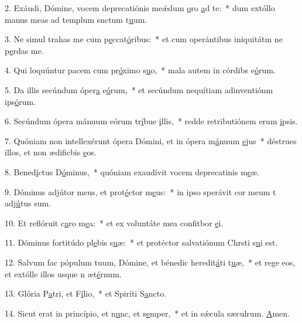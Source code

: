 2. Exáudi, Dómine, vocem deprecatiónis meǽdum \uline{o}ro \uline{a}d te:~* dum extóllo manus meas ad templum snctum t\uline{u}um.\par 
3. Ne simul trahas me cum p\uline{e}ccat\uline{ó}ribus:~* et cum operántibus iniquitátm ne p\uline{e}rdas me.\par 
4. Qui loquúntur pacem cum pr\uline{ó}ximo s\uline{u}o,~* mala autem in córdibs e\uline{ó}rum.\par 
5. Da illis secúndum óper\uline{a} e\uline{ó}rum,~* et secúndum nequítiam adinventiónm ips\uline{ó}rum.\par 
6. Secúndum ópera mánuum eórum tr\uline{í}bue \uline{i}llis,~* redde retributiónem erum \uline{i}psis.\par 
7. Quóniam non intellexérunt ópera Dómini, et in ópera m\uline{á}nuum \uline{e}jus~* déstrues illos, et non ædificbis \uline{e}os.\par 
8. Bened\uline{í}ctus D\uline{ó}minus,~* quóniam exaudívit vocem deprecatinis m\uline{e}æ.\par 
9. Dóminus adjútor meus, et prot\uline{é}ctor m\uline{e}us:~* in ipso sperávit cor meum t adj\uline{ú}tus sum.\par 
10. Et reflóruit c\uline{a}ro m\uline{e}a:~* et ex voluntáte mea confitbor \uline{e}i.\par 
11. Dóminus fortitúdo pl\uline{e}bis s\uline{u}æ:~* et protéctor salvatiónum Chrsti s\uline{u}i est.\par 
12. Salvum fac pópulum tuum, Dómine, et bénedic heredit\uline{á}ti t\uline{u}æ,~* et rege eos, et extólle illos usque n æt\uline{é}rnum.\par 
13. Glória P\uline{a}tri, et F\uline{í}lio,~* et Spiríti S\uline{a}ncto.\par 
14. Sicut erat in princípio, et n\uline{u}nc, et s\uline{e}mper,~* et in sǽcula sæculrum. \uline{A}men.\par 
